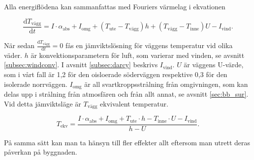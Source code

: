 Alla energiflödena kan sammanfattas med Fouriers värmelag i ekvationen 

\begin{equation}
\label{eq:walltemp}
\frac{\mathrm{d}T_\text{vägg}}{\mathrm{d}t} = 
I\cdot \alpha_\text{abs} + I_\text{omg} + (T_\text{ute} - T_\text{vägg}) h +( T_\text{vägg} - T_\text{inne} ) U - I_\text{vind}.
\end{equation}

När sedan $\frac{\mathrm{d}T_\text{vägg}}{\mathrm{d}t}=0$ fås en jämviktslösning för väggens temperatur vid olika väder. $h$ är konvektionsparametern för luft, som varierar med vinden, se avsnitt \ref{subsec:windconv}. I avsnitt \ref{subsec:darcy} beskrivs $I_\text{vind}$.
$U$ är väggens U-värde, som i vårt fall är 1,2 för den oisloerade söderväggen respektive 0,3 för den isolerade norrväggen. $I_\text{omg}$ är all svartkroppsstrålning från omgivningen, som kan delas upp i strålning från atmosfären och från allt annat, se avsnitt \ref{sec:bb_sur}. Vid detta jämviktsläge är $T_\text{vägg}$ ekvivalent temperatur.

\begin{equation}\boxed{ \; \; \;
\label{eq:ekvtemp}
T_\text{ekv} = 
\frac{I\cdot \alpha_\text{abs} + I_\text{omg} + T_\text{ute} \cdot h - T_\text{inne} \cdot U - I_\text{vind}}{h-U}.
\; \; \;}\end{equation}

På samma sätt kan man ta hänsyn till fler effekter allt eftersom man utrett deras påverkan på byggnaden.
